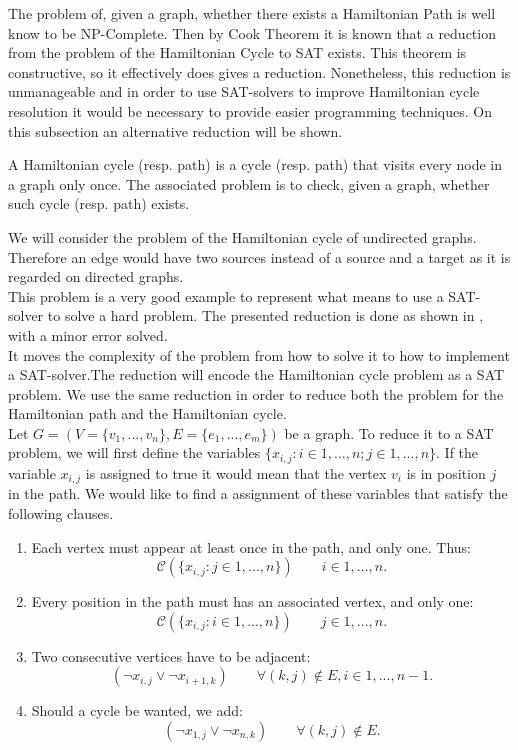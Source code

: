 The problem of, given a graph, whether there exists a Hamiltonian Path is well know to be NP-Complete. Then by Cook Theorem it is known that a reduction from the problem of the Hamiltonian Cycle to SAT exists. This theorem is constructive, so it effectively does gives a reduction. Nonetheless, this reduction is unmanageable and in order to use SAT-solvers to improve Hamiltonian cycle resolution it would be necessary to provide easier programming techniques. On this subsection an alternative reduction will be shown.

\begin{definition}
  A Hamiltonian cycle (resp. path) is a cycle (resp. path) that visits every node in a graph only once. The associated problem is to check, given a graph, whether such cycle (resp. path) exists.
\end{definition}

We will consider the problem of the Hamiltonian cycle of undirected graphs. Therefore an edge would have two sources instead of a source and a target as it is regarded on directed graphs.\\

This problem is a very good example to represent what means to use a SAT-solver to solve a hard problem. The presented reduction is done as shown in \cite{49593}, with a minor error solved.\\


It moves the complexity of the problem from how to solve it to how to implement a SAT-solver.The reduction will encode the Hamiltonian cycle problem as a SAT problem. We use the same reduction in order to reduce both the problem for the Hamiltonian path and the Hamiltonian cycle.\\

Let $G=(V=\{ v_1,...,v_n\},E= \{e_1,...,e_m\})$ be a graph. To reduce it to a SAT problem, we will first define the variables $\{x_{i,j}: i\in 1,...,n ; j\in 1,...,n \}$. If the variable $x_{i,j}$ is assigned to true it would mean that the vertex $v_i$ is in position $j$ in the path. We would like to find a assignment of these variables that satisfy the following clauses.


\begin{enumerate}
\item Each vertex must appear at least once in the path, and only one. Thus:
  $$\mathcal{C}( \{x_{i,j} : j \in 1,...,n \}) \qquad i \in 1,...,n.$$

\item Every position in the path must has an associated vertex, and only one:
  $$\mathcal{C}( \{x_{i,j} : i \in 1,...,n \}) \qquad j \in 1,...,n.$$
\item Two consecutive vertices have to be adjacent:
  $$(\neg x_{i,j} \vee \neg x_{i+1,k})\qquad \forall (k,j) \not \in E, i \in 1,...,n-1.$$
\item Should a cycle be wanted, we add:
  $$(\neg x_{1,j} \vee \neg x_{n,k})\qquad \forall (k,j) \not \in E.$$
\end{enumerate}

